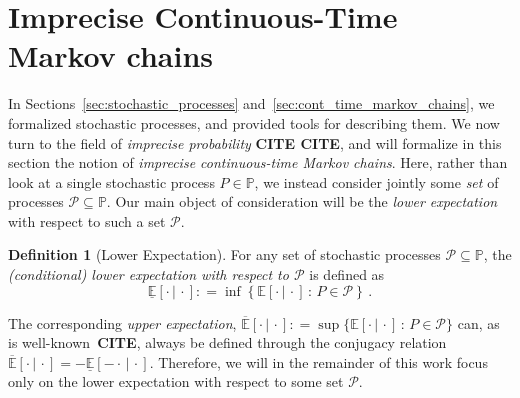 \documentclass[10pt,a4paper]{paper}
\theoremstyle{definition}
\newtheorem{proposition}[theorem]{Proposition}
\newtheorem{definition}{Definition}
\newcommand{\reals}{\mathbb{R}}
\newcommand{\realsnonneg}{\reals_{\geq 0}}
\newcommand{\processes}{\mathbb{P}}
\newcommand{\wmprocesses}{\processes^{\mathrm{WM}}}
\newcommand{\coloneqq}{:\!=}
\begin{document}

\section{Imprecise Continuous-Time Markov chains}
\label{sec:iCTMC}

In Sections~\ref{sec:stochastic_processes} and~\ref{sec:cont_time_markov_chains}, we formalized stochastic processes, and provided tools for describing them. We now turn to the field of \emph{imprecise probability} {\bf CITE CITE}, and will formalize in this section the notion of \emph{imprecise continuous-time Markov chains}. Here, rather than look at a single stochastic process $P\in\processes$, we instead consider jointly some \emph{set} of processes $\mathcal{P}\subseteq\processes$. Our main object of consideration will be the \emph{lower expectation} with respect to such a set $\mathcal{P}$.

\begin{definition}[Lower Expectation]\label{def:lower_exp}
For any set of stochastic processes $\mathcal{P}\subseteq\processes$, the \emph{(conditional) lower expectation with respect to $\mathcal{P}$} is defined as
\begin{equation*}
\underline{\mathbb{E}}[\cdot\,\vert\,\cdot] \coloneqq \inf\left\{\mathbb{E}[\cdot\,\vert\,\cdot]\,:\,P\in\mathcal{P}\right\}\,.
\end{equation*}
\vspace{0pt}
\end{definition}

\noindent The corresponding \emph{upper expectation}, $\overline{\mathbb{E}}[\cdot\,\vert\,\cdot]\coloneqq \sup\{\mathbb{E}[\cdot\,\vert\,\cdot]\,:\,P\in\mathcal{P}\}$ can, as is well-known~{\bf CITE}, always be defined through the conjugacy relation $\overline{\mathbb{E}}[\cdot\,\vert\,\cdot]=-\underline{\mathbb{E}}[-\cdot\,\vert\,\cdot]$. Therefore, we will in the remainder of this work focus only on the lower expectation with respect to some set $\mathcal{P}$.
\end{document}
